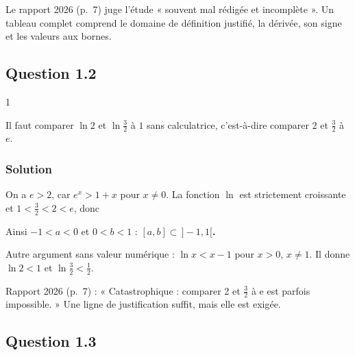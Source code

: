 \documentclass[11pt,a4paper]{article}
\newcommand{\equationajustee}[1]{%
  \sbox{\boiteequation}{$\displaystyle #1$}%
  \ifdim\wd\boiteequation>\linewidth
    \[\resizebox{\linewidth}{!}{\usebox{\boiteequation}}\]%
  \else
    \[#1\]%
  \fi}
\begin{document}
\begin{jury}

Le rapport 2026 (p.~7) juge l'étude « souvent mal rédigée et incomplète ». Un tableau complet comprend le domaine de définition justifié, la dérivée, son signe et les valeurs aux bornes.

\end{jury}

\hypertarget{question-1.2}{%
\subsection{Question 1.2}\label{question-1.2}}

\begin{indication}{1}

Il faut comparer \(\ln2\) et \(\ln\frac32\) à \(1\) sans calculatrice, c'est-à-dire comparer \(2\) et \(\frac32\) à \(e\).

\end{indication}

\hypertarget{solution-14}{%
\subsubsection{Solution}\label{solution-14}}

On a \(e>2\), car \(e^x>1+x\) pour \(x\neq0\). La fonction \(\ln\) est strictement croissante et \(1<\frac32<2<e\), donc

\equationajustee{0<\ln\frac32<\ln2<\ln e=1.}

Ainsi \(-1<a<0\) et \(0<b<1\) : \textbf{\([a,b]\subset\,]-1,1[\).}

\begin{methode}

Autre argument sans valeur numérique : \(\ln x<x-1\) pour \(x>0\), \(x\neq1\). Il donne \(\ln2<1\) et \(\ln\frac32<\frac12\).

\end{methode}

\begin{jury}

Rapport 2026 (p.~7) : « Catastrophique : comparer 2 et \(\frac32\) à e est parfois impossible. » Une ligne de justification suffit, mais elle est exigée.

\end{jury}

\hypertarget{question-1.3}{%
\subsection{Question 1.3}\label{question-1.3}}
\end{document}
